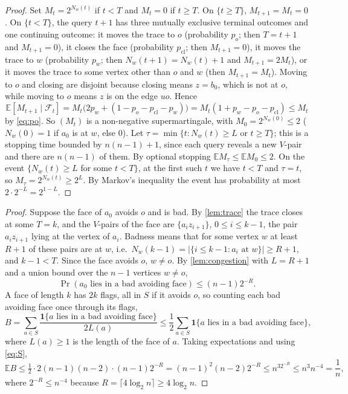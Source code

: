 \documentclass[11pt,a4paper]{article}
\theoremstyle{plain}
\theoremstyle{definition}
\theoremstyle{remark}
\newcommand{\E}{\mathbb E}
\newcommand{\cF}{\mathcal F}
\newcommand{\Ind}{\mathbf 1}
\begin{document}
\label{pf:congestion}
\lemcongestion*
\begin{proof}
Set $M_t=2^{N_w(t)}$ if $t<T$ and $M_t=0$ if $t\ge T$. On $\{t\ge T\}$, $M_{t+1}=M_t=0$. On $\{t<T\}$, the query $t+1$ has three mutually exclusive terminal outcomes and one continuing outcome: it moves the trace to $o$ (probability $p_o$; then $T=t+1$ and $M_{t+1}=0$), it closes the face (probability $p_{\mathrm{cl}}$; then $M_{t+1}=0$), it moves the trace to $w$ (probability $p_w$; then $N_w(t+1)=N_w(t)+1$ and $M_{t+1}=2M_t$), or it moves the trace to some vertex other than $o$ and $w$ (then $M_{t+1}=M_t$). Moving to $o$ and closing are disjoint because closing means $z=b_0$, which is not at $o$, while moving to $o$ means $z$ is on the edge $uo$. Hence
\[
\E[M_{t+1}\mid\cF_t]=M_t\bigl(2p_w+(1-p_o-p_{\mathrm{cl}}-p_w)\bigr)=M_t(1+p_w-p_o-p_{\mathrm{cl}})\le M_t
\]
by \eqref{eq:po}. So $(M_t)$ is a non-negative supermartingale, with $M_0=2^{N_w(0)}\le2$ ($N_w(0)=1$ if $a_0$ is at $w$, else $0$). Let $\tau=\min\{t:N_w(t)\ge L\text{ or }t\ge T\}$; this is a stopping time bounded by $n(n-1)+1$, since each query reveals a new $V$-pair and there are $n(n-1)$ of them. By optional stopping $\E M_\tau\le\E M_0\le2$. On the event $\{N_w(t)\ge L$ for some $t<T\}$, at the first such $t$ we have $t<T$ and $\tau=t$, so $M_\tau=2^{N_w(t)}\ge2^L$. By Markov's inequality the event has probability at most $2\cdot2^{-L}=2^{1-L}$.
\end{proof}

\label{pf:bad}
\lembad*
\begin{proof}
Suppose the face of $a_0$ avoids $o$ and is bad. By \cref{lem:trace} the trace closes at some $T=k$, and the $V$-pairs of the face are $\{a_iz_{i+1}\}$, $0\le i\le k-1$, the pair $a_iz_{i+1}$ lying at the vertex of $a_i$. Badness means that for some vertex $w$ at least $R+1$ of these pairs are at $w$, i.e.\ $N_w(k-1)=|\{i\le k-1:a_i\text{ at }w\}|\ge R+1$, and $k-1<T$. Since the face avoids $o$, $w\ne o$. By \cref{lem:congestion} with $L=R+1$ and a union bound over the $n-1$ vertices $w\ne o$,
\[
\Pr(a_0\text{ lies in a bad avoiding face})\le(n-1)2^{-R}.
\]
A face of length $k$ has $2k$ flags, all in $S$ if it avoids $o$, so counting each bad avoiding face once through its flags,
\[
B=\sum_{a\in S}\frac{\Ind\{a\text{ lies in a bad avoiding face}\}}{2L(a)}\le\frac12\sum_{a\in S}\Ind\{a\text{ lies in a bad avoiding face}\},
\]
where $L(a)\ge1$ is the length of the face of $a$. Taking expectations and using \eqref{eq:S},
\[
\E B\le\tfrac12\cdot2(n-1)(n-2)\cdot(n-1)2^{-R}=(n-1)^2(n-2)2^{-R}\le n^32^{-R}\le n^3n^{-4}=\frac1n,
\]
where $2^{-R}\le n^{-4}$ because $R=\lceil4\log_2n\rceil\ge4\log_2n$.
\end{proof}
\end{document}
